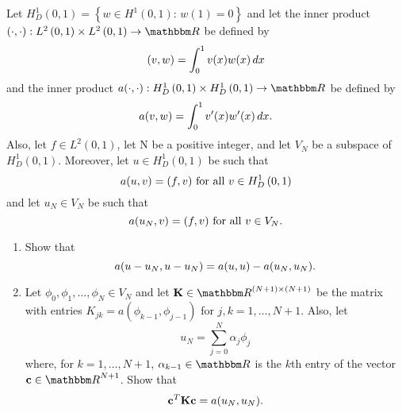 Let $H^1_D\left(0,1\right)=\left\{w\in H^1\left(0,1\right):\,w(1)=0\right\}$ and let the inner product $\ip{\cdot,\cdot}:L^2\left(0,1\right)\times L^2\left(0,1\right)\to\R$ be defined by
\[
(v,w)=\int_0^1v(x)w(x)\,dx
\]
and the inner product $a\ip{\cdot,\cdot}:H^1_D\left(0,1\right)\times H^1_D\left(0,1\right)\to\R$ be defined by
\[
a(v,w)=\int_0^1v'(x)w'(x)\,dx.
\]
Also, let $f\in L^2\left(0,1\right)$, let N be a positive integer, and let $V_N$ be a subspace of $H^1_D\left(0,1\right)$. Moreover, let $u\in H^1_D\left(0,1\right)$ be such that
\[
a(u,v)=(f,v)\mbox{ for all }v\in H^1_D\left(0,1\right)
\]
and let $u_N\in V_N$ be such that
\[
a(u_N,v)=(f,v)\mbox{ for all }v\in V_N.
\]

\begin{enumerate}
\item Show that
\[
a(u-u_N,u-u_N)=a(u,u)-a(u_N,u_N).
\]

\vspace*{1em}
\item Let $\phi_0,\phi_1,\ldots,\phi_N\in V_N$ and let $\BK\in\R^{\left(N+1\right)\times\left(N+1\right)}$ be the matrix with entries $K_{jk}=a(\phi_{k-1},\phi_{j-1})$ for $j,k=1,\ldots,N+1$. Also, let
\[
u_N=\sum_{j=0}^N\alpha_j\phi_j
\]
where, for $k=1,\ldots,N+1$, $\alpha_{k-1}\in\R$ is the $k$th entry of the vector $\Bc\in\R^{N+1}$. Show that
\[
{\bf c}^T{\bf K}{\bf c}=a(u_N,u_N).
\]
\end{enumerate}

           


